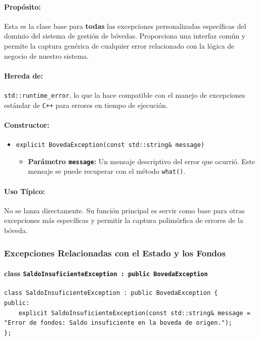 \documentclass{article}
\newcommand{\inlinecode}[1]{\texttt{#1}}
\begin{document}
\paragraph*{Propósito:} Esta es la clase base para \textbf{todas} las excepciones personalizadas específicas del dominio del sistema de gestión de bóvedas. Proporciona una interfaz común y permite la captura genérica de cualquier error relacionado con la lógica de negocio de nuestro sistema.

\paragraph*{Hereda de:} \inlinecode{std::runtime_error}, lo que la hace compatible con el manejo de excepciones estándar de \inlinecode{C++} para errores en tiempo de ejecución.

\paragraph*{Constructor:}
\begin{itemize}
    \item \inlinecode{explicit BovedaException(const std::string\& message)}
    \begin{itemize}
        \item \textbf{Parámetro \inlinecode{message}:} Un mensaje descriptivo del error que ocurrió. Este mensaje se puede recuperar con el método \inlinecode{what()}.
    \end{itemize}
\end{itemize}

\paragraph*{Uso Típico:} No se lanza directamente. Su función principal es servir como base para otras excepciones más específicas y permitir la captura polimórfica de errores de la bóveda.

\subsubsection*{Excepciones Relacionadas con el Estado y los Fondos}

\paragraph*{\textbf{class \inlinecode{SaldoInsuficienteException : public BovedaException}}}
\begin{lstlisting}
class SaldoInsuficienteException : public BovedaException {
public:
    explicit SaldoInsuficienteException(const std::string& message = "Error de fondos: Saldo insuficiente en la boveda de origen.");
};
\end{lstlisting}
\end{document}

